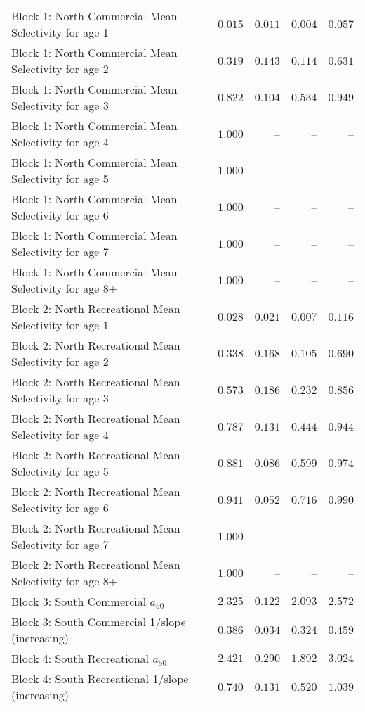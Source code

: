 \documentclass[
]{article}
\begin{document}
\begin{landscape}
\begin{longtable}[t]{lrrrr}
Block 1: North Commercial Mean Selectivity for age 1 & $0.015$ & $0.011$ & $0.004$ & $0.057$\\
Block 1: North Commercial Mean Selectivity for age 2 & $0.319$ & $0.143$ & $0.114$ & $0.631$\\
Block 1: North Commercial Mean Selectivity for age 3 & $0.822$ & $0.104$ & $0.534$ & $0.949$\\
Block 1: North Commercial Mean Selectivity for age 4 & $1.000$ & -- & -- & --\\
\addlinespace
Block 1: North Commercial Mean Selectivity for age 5 & $1.000$ & -- & -- & --\\
Block 1: North Commercial Mean Selectivity for age 6 & $1.000$ & -- & -- & --\\
Block 1: North Commercial Mean Selectivity for age 7 & $1.000$ & -- & -- & --\\
Block 1: North Commercial Mean Selectivity for age 8+ & $1.000$ & -- & -- & --\\
Block 2: North Recreational Mean Selectivity for age 1 & $0.028$ & $0.021$ & $0.007$ & $0.116$\\
\addlinespace
Block 2: North Recreational Mean Selectivity for age 2 & $0.338$ & $0.168$ & $0.105$ & $0.690$\\
Block 2: North Recreational Mean Selectivity for age 3 & $0.573$ & $0.186$ & $0.232$ & $0.856$\\
Block 2: North Recreational Mean Selectivity for age 4 & $0.787$ & $0.131$ & $0.444$ & $0.944$\\
Block 2: North Recreational Mean Selectivity for age 5 & $0.881$ & $0.086$ & $0.599$ & $0.974$\\
Block 2: North Recreational Mean Selectivity for age 6 & $0.941$ & $0.052$ & $0.716$ & $0.990$\\
\addlinespace
Block 2: North Recreational Mean Selectivity for age 7 & $1.000$ & -- & -- & --\\
Block 2: North Recreational Mean Selectivity for age 8+ & $1.000$ & -- & -- & --\\
Block 3: South Commercial $a_{50}$ & $2.325$ & $0.122$ & $2.093$ & $2.572$\\
Block 3: South Commercial 1/slope (increasing) & $0.386$ & $0.034$ & $0.324$ & $0.459$\\
Block 4: South Recreational $a_{50}$ & $2.421$ & $0.290$ & $1.892$ & $3.024$\\
\addlinespace
Block 4: South Recreational 1/slope (increasing) & $0.740$ & $0.131$ & $0.520$ & $1.039$\\

\end{longtable}
\end{landscape}
\end{document}
